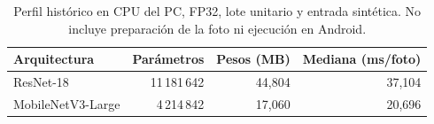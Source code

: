 \begin{table}[H]
\centering
\small
\caption{Perfil histórico en CPU del PC, FP32, lote unitario y entrada sintética. No incluye preparación de la foto ni ejecución en Android.}
\label{tab:profile}
\begin{tabularx}{\linewidth}{Y r r r}
\toprule
\textbf{Arquitectura} & \textbf{Parámetros} & \textbf{Pesos (MB)} & \textbf{Mediana (ms/foto)}\\
\midrule
ResNet-18 & 11\,181\,642 & 44,804 & 37,104\\
MobileNetV3-Large & 4\,214\,842 & 17,060 & 20,696\\
\bottomrule
\end{tabularx}
\end{table}
